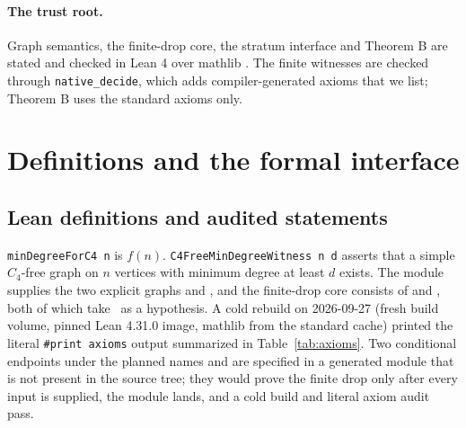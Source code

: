 \documentclass{anvil-paper}
\newcommand{\hnoFortyNine}{\lean{hno49}}
\theoremstyle{definition}
\begin{document}
\paragraph{The trust root.} Graph semantics, the finite-drop core, the stratum interface and Theorem B are stated and checked in Lean 4 \citep{moura2021lean4} over mathlib \citep{mathlib2020}. The finite witnesses are checked through \texttt{native\_decide}, which adds compiler-generated axioms that we list; Theorem B uses the standard axioms only.

\section{Definitions and the formal interface}\label{sec:prelim}

\subsection{Lean definitions and audited statements}\label{sec:lean-defs}

\texttt{minDegreeForC4 n} is $f(n)$. \texttt{C4FreeMinDegreeWitness n d} asserts that a simple $C_4$-free graph on $n$ vertices with minimum degree at least $d$ exists. The module  supplies the two explicit graphs  and , and the finite-drop core consists of  and , both of which take \hnoFortyNine\ as a hypothesis. A cold rebuild on 2026-09-27 (fresh build volume, pinned Lean 4.31.0 image, mathlib from the standard cache) printed the literal \texttt{\#print axioms} output summarized in Table~\ref{tab:axioms}. Two conditional endpoints under the planned names  and  are specified in a generated module that is not present in the source tree; they would prove the finite drop only after every input is supplied, the module lands, and a cold build and literal axiom audit pass.
\end{document}
